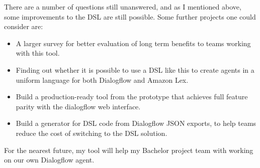 There are a number of questions still unanswered, and as I mentioned above, some improvements to the DSL are still possible.
Some further projects one could consider are:
\begin{itemize}
    \item A larger survey for better evaluation of long term benefits to teams working with this tool.
    \item Finding out whether it is possible to use a DSL like this to create agents in a uniform language for both Dialogflow and Amazon Lex.
    \item Build a production-ready tool from the prototype that achieves full feature parity with the dialogflow web interface.
    \item Build a generator for DSL code from Dialogflow JSON exports, to help teams reduce the cost of switching to the DSL solution.
\end{itemize}

For the nearest future, my tool will help my Bachelor project team with working on our own Dialogflow agent.
